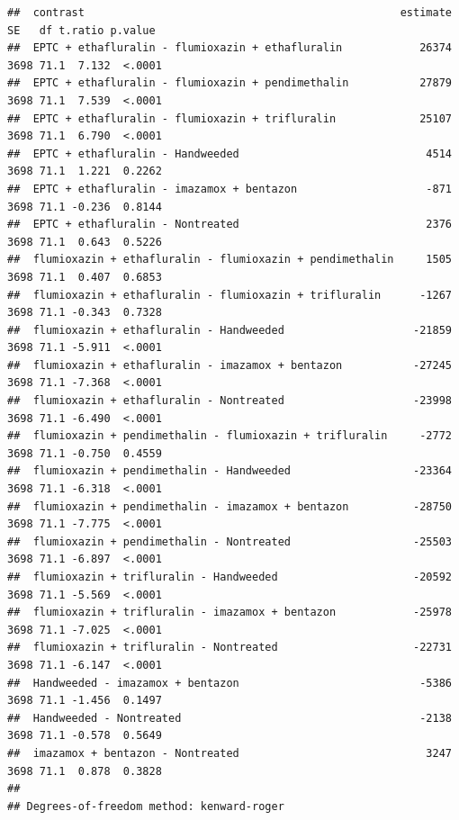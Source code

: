 \documentclass[letterpaper,]{book}
\newenvironment{Shaded}{\begin{snugshade}}{\end{snugshade}}
\newcommand{\NormalTok}[1]{#1}
\newcommand{\OperatorTok}[1]{\textcolor[rgb]{0.81,0.36,0.00}{\textbf{#1}}}
\begin{document}
\begin{Shaded}
\end{Shaded}

\begin{verbatim}
##  contrast                                                 estimate   SE   df t.ratio p.value
##  EPTC + ethafluralin - flumioxazin + ethafluralin            26374 3698 71.1  7.132  <.0001 
##  EPTC + ethafluralin - flumioxazin + pendimethalin           27879 3698 71.1  7.539  <.0001 
##  EPTC + ethafluralin - flumioxazin + trifluralin             25107 3698 71.1  6.790  <.0001 
##  EPTC + ethafluralin - Handweeded                             4514 3698 71.1  1.221  0.2262 
##  EPTC + ethafluralin - imazamox + bentazon                    -871 3698 71.1 -0.236  0.8144 
##  EPTC + ethafluralin - Nontreated                             2376 3698 71.1  0.643  0.5226 
##  flumioxazin + ethafluralin - flumioxazin + pendimethalin     1505 3698 71.1  0.407  0.6853 
##  flumioxazin + ethafluralin - flumioxazin + trifluralin      -1267 3698 71.1 -0.343  0.7328 
##  flumioxazin + ethafluralin - Handweeded                    -21859 3698 71.1 -5.911  <.0001 
##  flumioxazin + ethafluralin - imazamox + bentazon           -27245 3698 71.1 -7.368  <.0001 
##  flumioxazin + ethafluralin - Nontreated                    -23998 3698 71.1 -6.490  <.0001 
##  flumioxazin + pendimethalin - flumioxazin + trifluralin     -2772 3698 71.1 -0.750  0.4559 
##  flumioxazin + pendimethalin - Handweeded                   -23364 3698 71.1 -6.318  <.0001 
##  flumioxazin + pendimethalin - imazamox + bentazon          -28750 3698 71.1 -7.775  <.0001 
##  flumioxazin + pendimethalin - Nontreated                   -25503 3698 71.1 -6.897  <.0001 
##  flumioxazin + trifluralin - Handweeded                     -20592 3698 71.1 -5.569  <.0001 
##  flumioxazin + trifluralin - imazamox + bentazon            -25978 3698 71.1 -7.025  <.0001 
##  flumioxazin + trifluralin - Nontreated                     -22731 3698 71.1 -6.147  <.0001 
##  Handweeded - imazamox + bentazon                            -5386 3698 71.1 -1.456  0.1497 
##  Handweeded - Nontreated                                     -2138 3698 71.1 -0.578  0.5649 
##  imazamox + bentazon - Nontreated                             3247 3698 71.1  0.878  0.3828 
## 
## Degrees-of-freedom method: kenward-roger
\end{verbatim}
\end{document}
